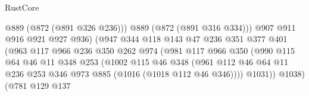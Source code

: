 \begin{lexlean}{RustCore}
\begin{coremodule}
                                        @889
                                        (@872 (@891 @326 @236)))
                                      @889
                                      (@872 (@891 @316 @334)))
                                    @907
                                    @911
                                    @916
                                    @921
                                    @927
                                    @936)
                                  (@947
                                    @344
                                    @118
                                    @143
                                    @47
                                    @236
                                    @351
                                    @377
                                    @401
                                    (@963
                                      @117
                                      @966
                                      @236
                                      @350
                                      @262
                                      @974
                                      (@981
                                        @117
                                        @966
                                        @350
                                        (@990
                                          @115
                                          @64
                                          @46
                                          @11
                                          @348
                                          @253
                                          (@1002
                                            @115
                                            @46
                                            @348
                                            (@961
                                              @112
                                              @46
                                              @64
                                              @11
                                              @236
                                              @253
                                              @346
                                              @973
                                              @885
                                              (@1016 (@1018 @112 @46 @346))))
                                          @1031))
                                      @1038)
                                    (@781
                                      @129
                                      @137

\end{coremodule}
\end{lexlean}
